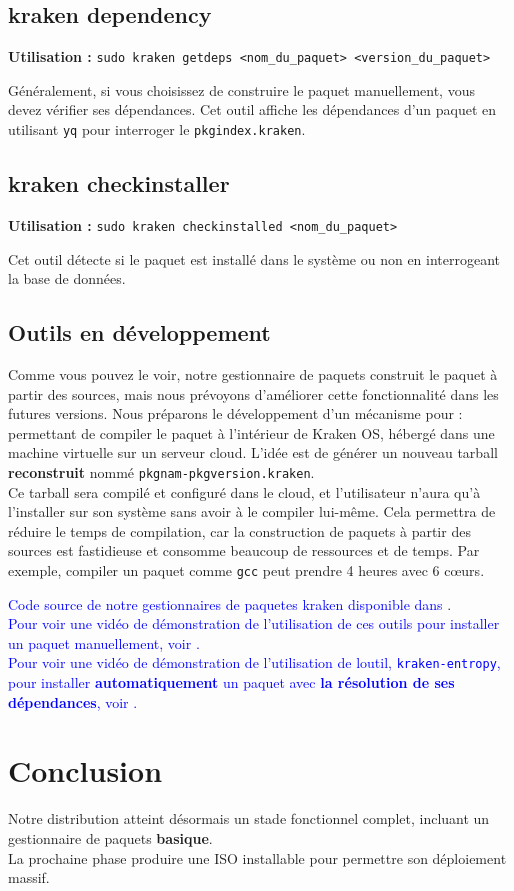 \subsection{kraken dependency}

\textbf{Utilisation :} \texttt{sudo kraken getdeps <nom\_du\_paquet> <version\_du\_paquet>}

Généralement, si vous choisissez de construire le paquet manuellement, vous devez vérifier ses dépendances. Cet outil affiche les dépendances d'un paquet en utilisant \texttt{yq} pour interroger le \texttt{pkgindex.kraken}.



\subsection{kraken checkinstaller}

\textbf{Utilisation :} \texttt{sudo kraken checkinstalled <nom\_du\_paquet>}

Cet outil détecte si le paquet est installé dans le système ou non en interrogeant la base de données.

 
\subsection{Outils en développement}

Comme vous pouvez le voir, notre gestionnaire de paquets construit le paquet à partir des sources, mais nous prévoyons d'améliorer cette fonctionnalité dans les futures versions. Nous préparons le développement d'un mécanisme pour :\\

  permettant de compiler le paquet à l'intérieur de Kraken OS, hébergé dans une machine virtuelle sur un serveur cloud. L'idée est de générer un nouveau tarball \textbf{reconstruit} nommé \texttt{pkgnam-pkgversion.kraken}.\\
Ce tarball sera compilé et configuré dans le cloud, et l'utilisateur n'aura qu'à l'installer sur son système sans avoir à le compiler lui-même.
Cela permettra de réduire le temps de compilation, car la construction de paquets à partir des sources est fastidieuse et consomme beaucoup de ressources et de temps. Par exemple, compiler un paquet comme \texttt{gcc} peut prendre 4 heures avec 6 cœurs.\\

\bigbreak

\textcolor{blue}{Code source  de notre gestionnaires de paquetes kraken  disponible dans  \cite{gestionnaire_paquets}}.\\
\bigbreak
\textcolor{blue}{Pour voir une vidéo de démonstration de l’utilisation de ces outils pour installer un paquet manuellement, voir \cite{kraken_tools}.}\\
\bigbreak
\textcolor{blue}{Pour voir une vidéo de démonstration de l’utilisation de loutil, \texttt{kraken-entropy}, pour installer \textbf{automatiquement} un paquet avec \textbf{la résolution de ses dépendances}, voir \cite{kraken_entropy}.}\\
\bigbreak
\section{Conclusion}
Notre distribution atteint désormais un stade fonctionnel complet, incluant un gestionnaire de paquets \textbf{basique}.\\
La prochaine phase  produire une ISO installable pour permettre son déploiement massif.